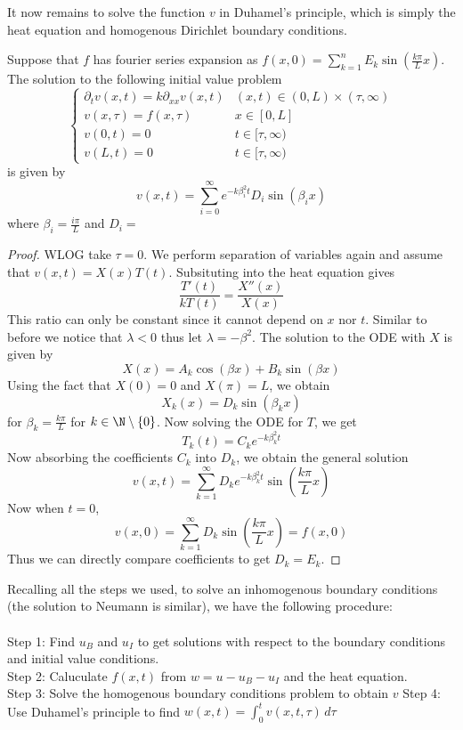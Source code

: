 \documentclass[a4paper]{article}
\begin{document}
It now remains to solve the function $v$ in Duhamel's principle, which is simply the heat equation and homogenous Dirichlet boundary conditions. 

\begin{prp}{}{} Suppose that $f$ has fourier series expansion as $f(x,0)=\sum_{k=1}^nE_k\sin\left(\frac{k\pi}{L}x\right)$. The solution to the following initial value problem $$\begin{cases}
\partial_tv(x,t)=k\partial_{xx}v(x,t) & (x,t)\in(0,L)\times(\tau,\infty)\\
v(x,\tau)=f(x,\tau) & x\in[0,L]\\
v(0,t)=0 & t\in[\tau,\infty)\\
v(L,t)=0 & t\in[\tau,\infty)
\end{cases}$$ is given by $$v(x,t)=\sum_{i=0}^\infty e^{-k\beta_i^2t}D_i\sin(\beta_ix)$$ where $\beta_i=\frac{i\pi}{L}$ and $D_i=$ \tcbline
\begin{proof}
WLOG take $\tau=0$. We perform separation of variables again and assume that $v(x,t)=X(x)T(t)$. Subsituting into the heat equation gives $$\frac{T'(t)}{kT(t)}=\frac{X''(x)}{X(x)}$$ This ratio can only be constant since it cannot depend on $x$ nor $t$. Similar to before we notice that $\lambda<0$ thus let $\lambda=-\beta^2$. The solution to the ODE with $X$ is given by $$X(x)=A_k\cos(\beta x)+B_k\sin(\beta x)$$ Using the fact that $X(0)=0$ and $X(\pi)=L$, we obtain $$X_k(x)=D_k\sin(\beta_k x)$$ for $\beta_k=\frac{k\pi}{L}$ for $k\in\N\setminus\{0\}$. Now solving the ODE for $T$, we get $$T_k(t)=C_ke^{-k\beta_k^2t}$$ Now absorbing the coefficients $C_k$ into $D_k$, we obtain the general solution $$v(x,t)=\sum_{k=1}^\infty D_ke^{-k\beta_k^2t}\sin\left(\frac{k\pi}{L}x\right)$$ Now when $t=0$, $$v(x,0)=\sum_{k=1}^\infty D_k\sin\left(\frac{k\pi}{L}x\right)=f(x,0)$$ Thus we can directly compare coefficients to get $D_k=E_k$. 
\end{proof}
\end{prp}

Recalling all the steps we used, to solve an inhomogenous boundary conditions (the solution to Neumann is similar), we have the following procedure: \\~\\
Step 1: Find $u_B$ and $u_I$ to get solutions with respect to the boundary conditions and initial value conditions. \\
Step 2: Caluculate $f(x,t)$ from $w=u-u_B-u_I$ and the heat equation. \\
Step 3: Solve the homogenous boundary conditions problem to obtain $v$
Step 4: Use Duhamel's principle to find $w(x,t)=\int_0 ^tv(x,t,\tau)\,d\tau$
\end{document}
